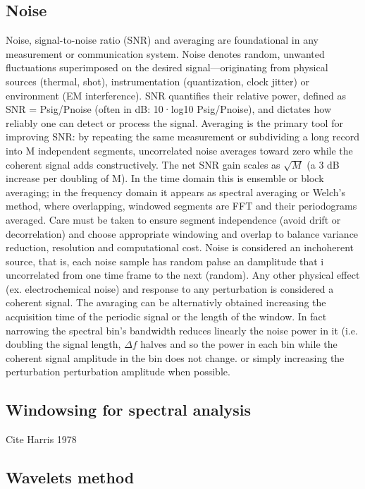 \subsection{Noise}

Noise, signal-to-noise ratio (SNR) and averaging are foundational in any measurement or communication system. Noise denotes random, unwanted fluctuations superimposed on the desired signal—originating from physical sources (thermal, shot), instrumentation (quantization, clock jitter) or environment (EM interference). SNR quantifies their relative power, defined as SNR = Psig/Pnoise (often in dB: 10·log10 Psig/Pnoise), and dictates how reliably one can detect or process the signal. Averaging is the primary tool for improving SNR: by repeating the same measurement or subdividing a long record into M independent segments, uncorrelated noise averages toward zero while the coherent signal adds constructively. The net SNR gain scales as $\sqrt{M}$ (a 3 dB increase per doubling of M). In the time domain this is ensemble or block averaging; in the frequency domain it appears as spectral averaging or Welch's method, where overlapping, windowed segments are FFT and their periodograms averaged. Care must be taken to ensure segment independence (avoid drift or decorrelation) and choose appropriate windowing and overlap to balance variance reduction, resolution and computational cost. 
Noise is considered an inchoherent source, that is, each noise sample has random pahse an damplitude that i uncorrelated from one time frame to the next (random). Any other physical effect (ex. electrochemical noise) and response to any perturbation is considered a coherent signal.
The avaraging can be alternativly obtained increasing the acquisition time of the periodic signal or the length of the window. In fact narrowing the spectral bin's bandwidth reduces linearly the noise power in it (i.e. doubling the signal length, $\Delta f$ halves and so the power in each bin while the coherent signal amplitude in the bin does not change.
or simply increasing the perturbation perturbation amplitude when possible.

\subsection{Windowsing for spectral analysis}
Cite Harris 1978

\subsection{Wavelets method}

